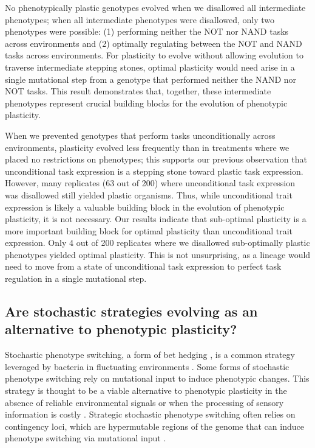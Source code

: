 No phenotypically plastic genotypes evolved when we disallowed all intermediate phenotypes; when all intermediate phenotypes were disallowed, only two phenotypes were possible: (1) performing neither the NOT nor NAND tasks across environments and (2) optimally regulating between the NOT and NAND tasks across environments.
For plasticity to evolve without allowing evolution to traverse intermediate stepping stones, optimal plasticity would need arise in a single mutational step from a genotype that performed neither the NAND nor NOT tasks.
This result demonstrates that, together, these intermediate phenotypes represent crucial building blocks for the evolution of phenotypic plasticity. 

When we prevented genotypes that perform tasks unconditionally across environments, plasticity evolved less frequently than in treatments where we placed no restrictions on phenotypes; this supports our previous observation that unconditional task expression is a stepping stone toward plastic task expression. However, many replicates (63 out of 200) where unconditional task expression was disallowed still yielded plastic organisms. Thus, while unconditional trait expression is likely a valuable building block in the evolution of phenotypic plasticity, it is not necessary. Our results indicate that sub-optimal plasticity is a more important building block for optimal plasticity than unconditional trait expression. Only 4 out of 200 replicates where we disallowed sub-optimally plastic phenotypes yielded optimal plasticity. This is not unsurprising, as a lineage would need to move from a state of unconditional task expression to perfect task regulation in a single mutational step.

\begin{raggedright}
\subsection{Are stochastic strategies evolving as an alternative to phenotypic plasticity?}
\end{raggedright}

Stochastic phenotype switching, a form of bet hedging \citep{seger_what_1987}, is a common strategy leveraged by bacteria in fluctuating environments \citep{rainey_evolutionary_2011}. 
Some forms of stochastic phenotype switching rely on mutational input to induce phenotypic changes. 
This strategy is thought to be a viable alternative to phenotypic plasticity in the absence of reliable environmental signals or when the processing of sensory information is costly \citep{rainey_evolutionary_2011}.
Strategic stochastic phenotype switching often relies on contingency loci, which are hypermutable regions of the genome that can induce phenotype switching via mutational input \citep{moxon_bacterial_2006}. 

